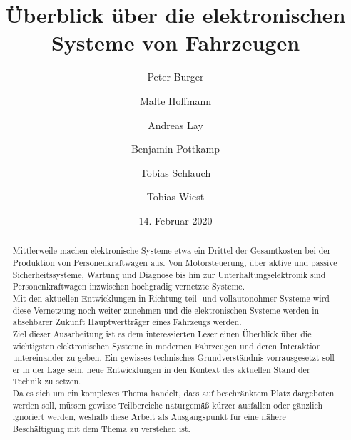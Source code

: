 \documentclass[]{article}
\title{Überblick über die elektronischen Systeme von Fahrzeugen}
\author{
	Peter Burger
	\and
	Malte Hoffmann
	\and
	Andreas Lay
	\and
	Benjamin Pottkamp
	\and
	Tobias Schlauch
	\and
	Tobias Wiest
}
\date{14. Februar 2020}
\begin{document}
\maketitle

\begin{abstract}
	Mittlerweile machen elektronische Systeme etwa ein Drittel der Gesamtkosten bei der Produktion von
	Personenkraftwagen aus. Von Motorsteuerung, über aktive und passive Sicherheitssysteme, 
	Wartung und Diagnose bis hin zur Unterhaltungselektronik sind Personenkraftwagen inzwischen hochgradig
	vernetzte Systeme.\\
	
	Mit den aktuellen Entwicklungen in Richtung teil- und vollautonohmer Systeme wird diese Vernetzung noch weiter zunehmen 
	und die elektronischen Systeme werden in absehbarer Zukunft Hauptwertträger eines Fahrzeugs werden.\\
	
	Ziel dieser Ausarbeitung ist es dem interessierten Leser einen Überblick über die wichtigsten elektronischen Systeme in
	modernen Fahrzeugen und deren Interaktion untereinander zu geben. Ein gewisses technisches Grundverständnis vorrausgesetzt 
	soll er in der Lage sein, neue Entwicklungen in den Kontext des aktuellen Stand der Technik zu setzen.\\
	
	Da es sich um ein komplexes Thema handelt, dass auf beschränktem Platz dargeboten werden soll, müssen gewisse Teilbereiche naturgemäß
	kürzer ausfallen oder gänzlich ignoriert werden, weshalb diese Arbeit als Ausgangspunkt für eine nähere Beschäftigung mit dem Thema
	zu verstehen ist.
\end{abstract}

\newpage

\tableofcontents











\end{document}
